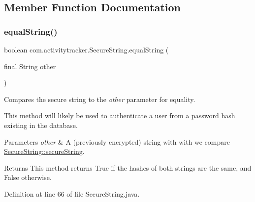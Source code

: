 \subsection{Member Function Documentation}
\mbox{\label{classcom_1_1activitytracker_1_1_secure_string_a8b5c3cac74b22ff0eb3c43a7ebd980f5}} 
\subsubsection{\texorpdfstring{equalString()}{equalString()}}
{\footnotesize\ttfamily boolean com.\+activitytracker.\+Secure\+String.\+equal\+String (\begin{DoxyParamCaption}\item[{final String}]{other }\end{DoxyParamCaption})}

Compares the secure string to the {\itshape other} parameter for equality.

This method will likely be used to authenticate a user from a password hash existing in the database.


\begin{DoxyParams}{Parameters}
{\em other} & A (previously encrypted) string with with we compare \mbox{\hyperlink{classcom_1_1activitytracker_1_1_secure_string_a1448f7b8865c6c57cc7218662ee7f1ee}{Secure\+String\+::secure\+String}}.\\
\hline
\end{DoxyParams}
\begin{DoxyReturn}{Returns}
This method returns True if the hashes of both strings are the same, and False otherwise. 
\end{DoxyReturn}


Definition at line 66 of file Secure\+String.\+java.


\begin{DoxyCode}{0}

\end{DoxyCode}
\mbox{\label{classcom_1_1activitytracker_1_1_secure_string_a1907ad109bb5e64291fabd3ff459ef49}} 
